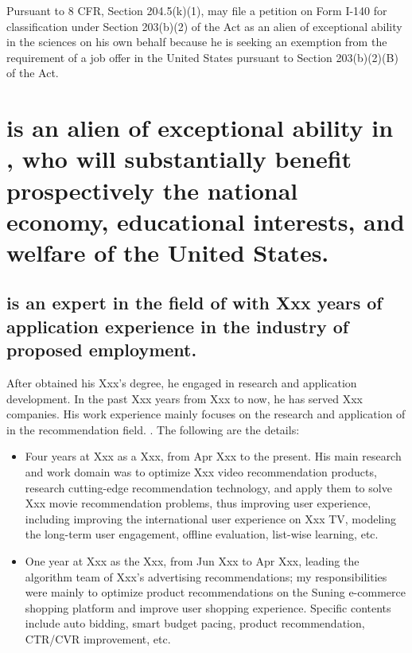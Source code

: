 \documentclass[11pt]{article}
\begin{document}
Pursuant to 8 CFR, Section 204.5(k)(1), \dr may file a petition on Form I-140 for classification under Section 203(b)(2) of the Act as an alien of exceptional ability in the sciences on his own behalf because he is seeking an exemption from the requirement of a job offer in the United States pursuant to Section 203(b)(2)(B) of the Act.


\pagebreak




\section{\dr is an alien of exceptional ability in \fie{}, who will substantially benefit prospectively the national economy, educational interests, and welfare of the United States.}
\label{section1}

\subsection{ \dr is an expert in the field of \fie{} with Xxx years of application experience in the industry of proposed employment.}
\label{yoe}

After \dr obtained his Xxx’s degree, he engaged in \fie{} research and application development. In the past Xxx years from Xxx to now, he has served Xxx companies. His work experience mainly focuses on the research and application of \fie{} in the recommendation field. \cite{workexp}. The following are the details: 


\begin{itemize}
    \item Four years at Xxx as a Xxx, from Apr Xxx to the present. His main research and work domain was to optimize Xxx video recommendation products, research cutting-edge recommendation technology, and apply them to solve Xxx movie recommendation problems, thus improving user experience, including improving the international user experience on Xxx TV, modeling the long-term user engagement, offline evaluation, list-wise learning, etc.

    \item One year at Xxx as the Xxx, from Jun Xxx to Apr Xxx, leading the algorithm team of Xxx's advertising recommendations; my responsibilities were mainly to optimize product recommendations on the Suning e-commerce shopping platform and improve user shopping experience. Specific contents include auto bidding, smart budget pacing, product recommendation, CTR/CVR improvement, etc.
\end{itemize}
\end{document}
